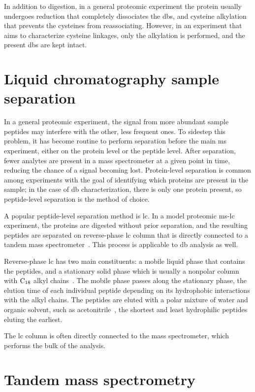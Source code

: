In addition to digestion, in a general proteomic experiment the protein usually undergoes reduction that completely dissociates the \glspl*{db}, and cysteine alkylation that prevents the cysteines from reassociating. However, in an experiment that aims to characterize cysteine linkages, only the alkylation is performed, and the present \glspl*{db} are kept intact.

\section{Liquid chromatography sample separation}\label{sec:lc}

In a general proteomic experiment, the signal from more abundant sample peptides may interfere with the other, less frequent ones. To sidestep this problem, it has become routine to perform separation before the main \gls*{ms} experiment, either on the protein level or the peptide level. After separation, fewer analytes are present in a mass spectrometer at a given point in time, reducing the chance of a signal becoming lost. Protein-level separation is common among experiments with the goal of identifying which proteins are present in the sample; in the case of \gls*{db} characterization, there is only one protein present, so peptide-level separation is the method of choice.

A popular peptide-level separation method is \gls*{lc}. In a model proteomic \gls*{ms}-\gls*{lc} experiment, the proteins are digested without prior separation, and the resulting peptides are separated on reverse-phase \gls*{lc} column that is directly connected to a tandem mass spectrometer~\cite{washburn2001large}. This process is applicable to \gls*{db} analysis as well.

Reverse-phase \gls*{lc} has two main constituents: a mobile liquid phase that contains the peptides, and a stationary solid phase which is usually a nonpolar column with \(\ce{C18}\) alkyl chains~\cite{chang1976high}. The mobile phase passes along the stationary phase, the elution time of each individual peptide depending on its hydrophobic interactions with the alkyl chains. The peptides are eluted with a polar mixture of water and organic solvent, such as acetonitrile~\cite{frohlich2006proteome}, the shortest and least hydrophilic peptides eluting the earliest.

The \gls*{lc} column is often directly connected to the mass spectrometer, which performs the bulk of the analysis.


\section{Tandem mass spectrometry}\label{sec:msms}

